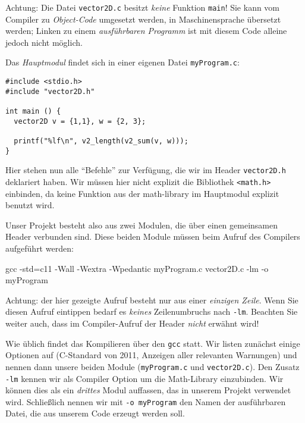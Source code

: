 Achtung: Die Datei \texttt{vector2D.c} besitzt \emph{keine} Funktion \texttt{main}! Sie kann vom Compiler zu \emph{Object-Code} umgesetzt werden, \ie in Maschinensprache übersetzt werden; Linken zu einem \emph{ausführbaren Programm} ist mit diesem Code alleine jedoch nicht möglich.

Das \emph{Hauptmodul} findet sich in einer eigenen Datei \texttt{myProgram.c}:

\begin{codebox}
\begin{verbatim}
#include <stdio.h>
#include "vector2D.h"

int main () {
  vector2D v = {1,1}, w = {2, 3};

  printf("%lf\n", v2_length(v2_sum(v, w)));
}
\end{verbatim}
\end{codebox}

Hier stehen nun alle \enquote{Befehle} zur Verfügung, die wir im Header \texttt{vector2D.h} deklariert haben. Wir müssen hier nicht explizit die Bibliothek \texttt{<math.h>} einbinden, da keine Funktion aus der math-library im Hauptmodul explizit benutzt wird.

Unser Projekt besteht also aus zwei Modulen, die über einen gemeinsamen Header verbunden sind. Diese beiden Module müssen beim Aufruf des Compilers aufgeführt werden:

\begin{cmdbox}
gcc -std=c11 -Wall -Wextra -Wpedantic myProgram.c vector2D.c -lm -o myProgram
\end{cmdbox}

Achtung: der hier gezeigte Aufruf besteht nur aus einer \emph{einzigen Zeile}. Wenn Sie diesen Aufruf eintippen bedarf es \emph{keines} Zeilenumbruchs nach \texttt{-lm}. Beachten Sie weiter auch, dass im Compiler-Aufruf der Header \emph{nicht} erwähnt wird!

Wie üblich findet das Kompilieren über den \texttt{gcc} statt. Wir listen zunächst einige Optionen auf (C-Standard von 2011, Anzeigen aller relevanten Warnungen) und nennen dann unsere beiden Module (\texttt{myProgram.c} und \texttt{vector2D.c}). Den Zusatz \texttt{-lm} kennen wir als Compiler Option um die Math-Library einzubinden. Wir können dies als ein \emph{drittes} Modul auffassen, das in unserem Projekt verwendet wird. Schließlich nennen wir mit \texttt{-o myProgram} den Namen der ausführbaren Datei, die aus unserem Code erzeugt werden soll.


